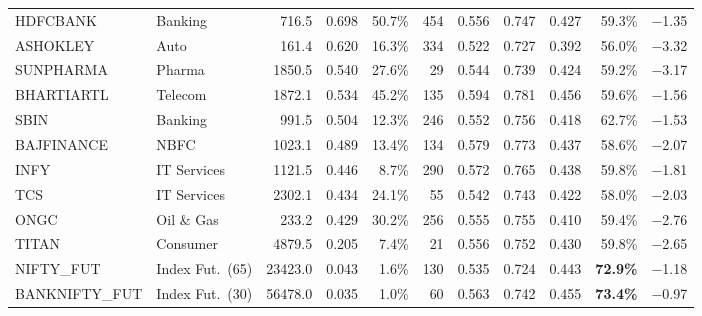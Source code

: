 \documentclass[12pt,a4paper,oneside]{report}
\begin{document}
\begin{table}[H]
\begin{tabular}{@{}llrrrrrrrrr@{}}
HDFCBANK & Banking & 716.5 & 0.698 & 50.7\% & 454 & 0.556 & 0.747 & 0.427 & 59.3\% & $-$1.35 \\
ASHOKLEY & Auto & 161.4 & 0.620 & 16.3\% & 334 & 0.522 & 0.727 & 0.392 & 56.0\% & $-$3.32 \\
SUNPHARMA & Pharma & 1850.5 & 0.540 & 27.6\% & 29 & 0.544 & 0.739 & 0.424 & 59.2\% & $-$3.17 \\
BHARTIARTL & Telecom & 1872.1 & 0.534 & 45.2\% & 135 & 0.594 & 0.781 & 0.456 & 59.6\% & $-$1.56 \\
SBIN & Banking & 991.5 & 0.504 & 12.3\% & 246 & 0.552 & 0.756 & 0.418 & 62.7\% & $-$1.53 \\
BAJFINANCE & NBFC & 1023.1 & 0.489 & 13.4\% & 134 & 0.579 & 0.773 & 0.437 & 58.6\% & $-$2.07 \\
INFY & IT Services & 1121.5 & 0.446 & 8.7\% & 290 & 0.572 & 0.765 & 0.438 & 59.8\% & $-$1.81 \\
TCS & IT Services & 2302.1 & 0.434 & 24.1\% & 55 & 0.542 & 0.743 & 0.422 & 58.0\% & $-$2.03 \\
ONGC & Oil \& Gas & 233.2 & 0.429 & 30.2\% & 256 & 0.555 & 0.755 & 0.410 & 59.4\% & $-$2.76 \\
TITAN & Consumer & 4879.5 & 0.205 & 7.4\% & 21 & 0.556 & 0.752 & 0.430 & 59.8\% & $-$2.65 \\
NIFTY\_FUT & Index Fut.\ (65) & 23423.0 & 0.043 & 1.6\% & 130 & 0.535 & 0.724 & 0.443 & \textbf{72.9\%} & $-$1.18 \\
BANKNIFTY\_FUT & Index Fut.\ (30) & 56478.0 & 0.035 & 1.0\% & 60 & 0.563 & 0.742 & 0.455 & \textbf{73.4\%} & $-$0.97 \\
\bottomrule
\end{tabular}
\end{table}
\end{document}
